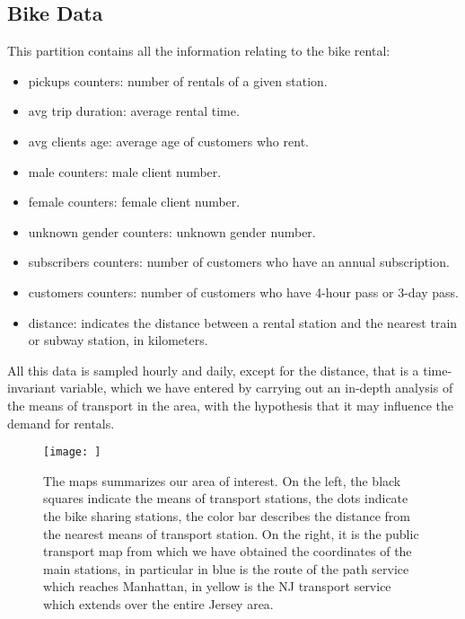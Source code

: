 \subsection{Bike Data}
This partition contains all the information relating to the bike rental:
\begin{itemize}
	\item pickups counters: number of rentals of a given station.
	\item avg trip duration: average rental time.
	\item avg clients age: average age of customers who rent.
	\item male counters: male client number.
	\item female counters: female client number.
	\item unknown gender counters: unknown gender number.
	\item subscribers counters: number of customers who have an annual subscription.
	\item customers counters: number of customers who have 4-hour pass or 3-day pass. 
	\item distance: indicates the distance between a rental station and the nearest train or subway station, in kilometers.
\end{itemize}
All this data is sampled hourly and daily, except for the distance, that is a time-invariant variable, which we have entered by carrying out an in-depth analysis of the means of transport in the area, with the hypothesis that it may influence the demand for rentals. 
\begin{figure}[h!] 
	\begin{center} 
		\texttt{[image: ]}\\ 
		\caption{The maps summarizes our area of interest. On the left, the black squares indicate the means of transport stations, the dots indicate the bike sharing stations, the color bar describes the distance from the nearest means of transport station. On the right, it is the public transport map from which we have obtained the coordinates of the main stations, in particular in blue is the route of the path service which reaches Manhattan, in yellow is the NJ transport service which extends over the entire Jersey area.} 
	\end{center} 
\end{figure}
